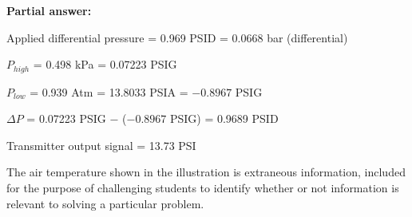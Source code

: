 





\noindent
{\bf Partial answer:}

\vskip 10pt

Applied differential pressure = 0.969 PSID = 0.0668 bar (differential)







$P_{high}$ = 0.498 kPa = 0.07223 PSIG

$P_{low}$ = 0.939 Atm = 13.8033 PSIA = $-0.8967$ PSIG

$\Delta P$ = 0.07223 PSIG $-$ ($-0.8967$ PSIG) = 0.9689 PSID

\vskip 10pt

Transmitter output signal = 13.73 PSI

\vskip 10pt

The air temperature shown in the illustration is extraneous information, included for the purpose of challenging students to identify whether or not information is relevant to solving a particular problem.




